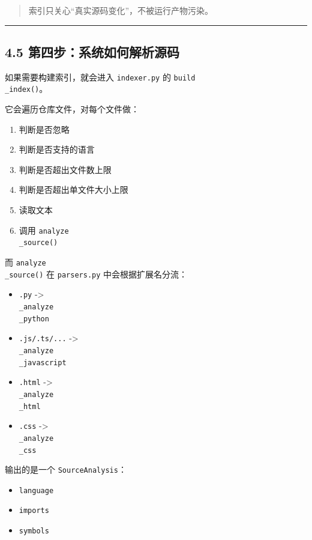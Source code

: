 \documentclass[UTF8,12pt,openany]{ctexbook}
\begin{document}
\begin{quote}
索引只关心“真实源码变化”，不被运行产物污染。
\end{quote}

\hrule

\subsection{4.5 第四步：系统如何解析源码}

如果需要构建索引，就会进入 \texttt{indexer.py} 的 \texttt{build\\_index()}。\par

它会遍历仓库文件，对每个文件做：\par

\begin{enumerate}
\item 判断是否忽略
\item 判断是否支持的语言
\item 判断是否超出文件数上限
\item 判断是否超出单文件大小上限
\item 读取文本
\item 调用 \texttt{analyze\\_source()}
\end{enumerate}

而 \texttt{analyze\\_source()} 在 \texttt{parsers.py} 中会根据扩展名分流：\par

\begin{itemize}
\item \texttt{.py} -> \texttt{\\_analyze\\_python}
\item \texttt{.js/.ts/...} -> \texttt{\\_analyze\\_javascript}
\item \texttt{.html} -> \texttt{\\_analyze\\_html}
\item \texttt{.css} -> \texttt{\\_analyze\\_css}
\end{itemize}

输出的是一个 \texttt{SourceAnalysis}：\par

\begin{itemize}
\item \texttt{language}
\item \texttt{imports}
\item \texttt{symbols}
\end{itemize}
\end{document}

